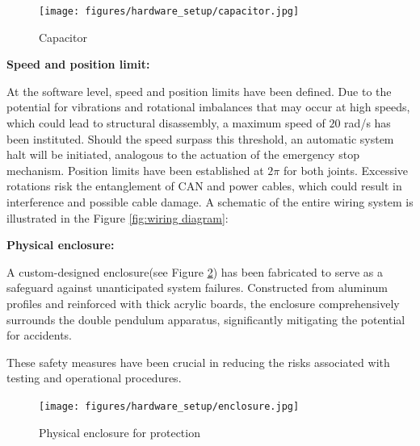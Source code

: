 \begin{figure}[H]
    \centering
    \texttt{[image: figures/hardware\_setup/capacitor.jpg]}
    \caption{Capacitor}
    \label{fig:capacitor}
\end{figure}

\textbf{Speed and position limit:}

At the software level, speed and position limits have been defined. Due to the potential for vibrations and rotational imbalances that may occur at high speeds, which could lead to structural disassembly, a maximum speed of \(20\) rad/s has been instituted. Should the speed surpass this threshold, an automatic system halt will be initiated, analogous to the actuation of the emergency stop mechanism. Position limits have been established at \(2\pi\) for both joints. Excessive rotations risk the entanglement of CAN and power cables, which could result in interference and possible cable damage. A schematic of the entire wiring system is illustrated in the Figure \ref{fig:wiring diagram}:

\textbf{Physical enclosure:}

A custom-designed enclosure(see Figure \ref{fig:overview_experiment_setup}) has been fabricated to serve as a safeguard against unanticipated system failures. Constructed from aluminum profiles and reinforced with thick acrylic boards, the enclosure comprehensively surrounds the double pendulum apparatus, significantly mitigating the potential for accidents.

These safety measures have been crucial in reducing the risks associated with testing and operational procedures.

\begin{figure}[H]
    \centering
    \texttt{[image: figures/hardware\_setup/enclosure.jpg]}
    \caption{Physical enclosure for protection}
    \label{fig:overview_experiment_setup}
\end{figure}

